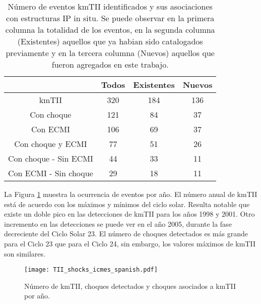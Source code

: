 \documentclass[baaa]{baaa}
\begin{document}
 \begin{table}[htbp]
 \caption{Número de eventos kmTII identificados y sus asociaciones con estructuras IP in situ. Se puede observar en la primera columna la totalidad de los eventos, en la segunda columna (Existentes) aquellos que ya habian sido catalogados previamente y en la tercera columna (Nuevos) aquellos que fueron agregados en este trabajo.}
\captionsetup{width=1\textwidth}
\begin{tabular}{cccc}
\hline
  & Todos & Existentes & Nuevos  \\
\hline
 kmTII  &  320 & 184 & 136 \\
 Con choque & 121 & 84 & 37 \\
 Con ECMI & 106 & 69 & 37\\
 Con choque y ECMI & 77 & 51 & 26 \\
 Con choque - Sin ECMI & 44 & 33 & 11 \\
 Con ECMI - Sin choque & 29 & 18 & 11 \\
 \hline
\end{tabular}
\label{table:resumen}
\end{table}

La Figura \ref{Fig2} muestra la ocurrencia de eventos por año. El número anual de kmTII está de acuerdo con los máximos y mínimos del ciclo solar. Resulta notable que existe un doble pico en las detecciones de kmTII para los años 1998 y 2001. Otro incremento en las detecciones se puede ver en el año 2005, durante la fase decreciente del Ciclo Solar 23. El número de choques detectados es más grande para el Ciclo 23 que para el Ciclo 24, sin embargo, los valores máximos de kmTII son similares.


\begin{figure}[htb]
\centering
\texttt{[image: TII\_shocks\_icmes\_spanish.pdf]} 
\caption{Número de kmTII, choques detectados y choques asociados a kmTII por año.}
\label{Fig2}
\end{figure}
\end{document}
